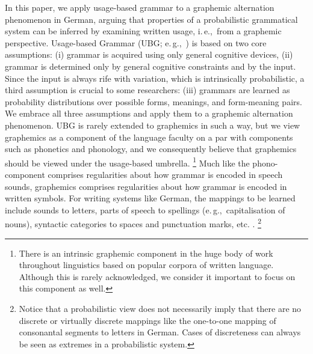 \documentclass[biblatex, charis, linguex]{glossa}\usepackage{knitr}
\newcommand{\ie}{i.\,e.,\ }
\newcommand{\egg}{e.\,g.,\ }
\begin{document}
In this paper, we apply usage-based grammar to a graphemic alternation phenomenon in German, arguing that properties of a probabilistic grammatical system can be inferred by examining written usage, \ie from a graphemic perspective.
Usage-based Grammar (UBG; \egg \citealt{BybeeBeckner2009,Kapatsinski2014,Tomasello2003}) is based on two core assumptions: (i) grammar is acquired using only general cognitive devices, (ii) grammar is determined only by general cognitive constraints and by the input.
Since the input is always rife with variation, which is intrinsically probabilistic, a third assumption is crucial to some researchers: (iii) grammars are learned as probability distributions over possible forms, meanings, and form-meaning pairs.
We embrace all three assumptions and apply them to a graphemic alternation phenomenon.
UBG is rarely extended to graphemics in such a way, but we view graphemics as a component of the language faculty on a par with components such as phonetics and phonology, and we consequently believe that graphemics should be viewed under the usage-based umbrella.%
\footnote{There is an intrinsic graphemic component in the huge body of work throughout linguistics based on popular corpora of written language.
Although this is rarely acknowledged, we consider it important to focus on this component as well.}
Much like the phono-component comprises regularities about how grammar is encoded in speech sounds, graphemics comprises  regularities about how grammar is encoded in written symbols.
For writing systems like German, the mappings to be learned include sounds to letters, parts of speech to spellings (\egg capitalisation of nouns), syntactic categories to spaces and punctuation marks, etc. \parencite{Primus2010}.%
\footnote{Notice that a probabilistic view does not necessarily imply that there are no discrete or virtually discrete mappings like the one-to-one mapping of consonantal segments to letters in German.
Cases of discreteness can always be seen as extremes in a probabilistic system.}
\end{document}
